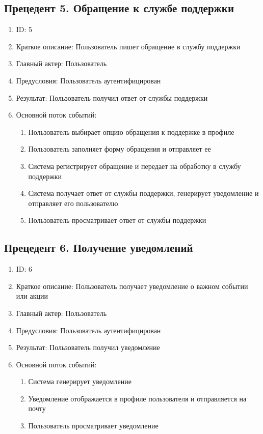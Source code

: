 \documentclass{article}
\begin{document}
\subsection{Прецедент 5. Обращение к службе поддержки}
\begin{enumerate}
    \item ID: 5
    \item Краткое описание: Пользователь пишет обращение в службу поддержки
    \item Главный актер: Пользователь
    \item Предусловия: Пользователь аутентифицирован
    \item Результат: Пользователь получил ответ от службы поддержки
    \item Основной поток событий:
    \begin{enumerate}
        \item Пользователь выбирает опцию обращения к поддержке в профиле
        \item Пользователь заполняет форму обращения и отправляет ее
        \item Система регистрирует обращение и передает на обработку в службу поддержки
        \item Система получает ответ от службы поддержки, генерирует уведомление и отправляет его пользователю
        \item Пользователь просматривает ответ от службы поддержки
    \end{enumerate}
\end{enumerate}

\subsection{Прецедент 6. Получение уведомлений }
\begin{enumerate}
    \item ID: 6
    \item Краткое описание: Пользователь получает уведомление о важном событии или акции
    \item Главный актер: Пользователь
    \item Предусловия: Пользователь аутентифицирован
    \item Результат: Пользователь получил уведомление
    \item Основной поток событий:
    \begin{enumerate}
        \item Система генерирует уведомление
        \item Уведомление отображается в профиле пользователя и отправляется на почту
        \item Пользователь просматривает уведомление
    \end{enumerate}
\end{enumerate}
\end{document}
